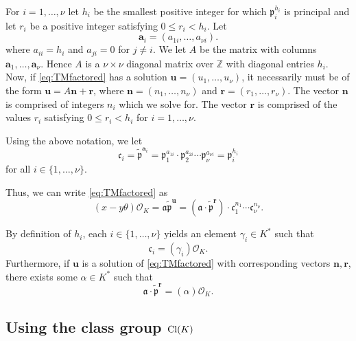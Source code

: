For $i = 1, \dots, {\nu}$ let $h_i$ be the smallest positive integer for which $\mathfrak{p}_i^{h_i}$ is principal and let 
$r_i$ be a positive integer satisfying $0 \leq r_i < h_i$. Let
\[\mathbf{a}_i = (a_{1i}, \dots, a_{{\nu}i}).\]
where $a_{ii} = h_i$ and $a_{ji} = 0$ for $j \neq i$. We let $A$ be the matrix with columns $\mathbf{a}_1, \dots, \mathbf{a}_{\nu}$. Hence $A$ is a $\nu \times \nu$ diagonal matrix over $\mathbb{Z}$ with diagonal entries $h_i$. Now, if \eqref{eq:TMfactored} has a solution $\mathbf{u} = (u_1, \dots, u_{\nu})$, it necessarily must be of the form $\mathbf{u} = A\mathbf{n} + \mathbf{r}$, where $\mathbf{n} = (n_1, \dots, n_{\nu})$ and $\mathbf{r} = (r_1, \dots, r_{\nu})$. The vector $\mathbf{n}$ is comprised of integers $n_i$ which we solve for. The vector $\mathbf{r}$ is comprised of the values $r_i$ satisfying $0 \leq r_i < h_i$ for $i = 1, \dots, \nu$. 

Using the above notation, we let
\[\mathfrak{c}_i = \tilde{\mathfrak{p}}^{\mathbf{a}_i}=\mathfrak{p}_1^{a_{1i}}\cdot \mathfrak{p}_2^{a_{2i}} \cdots \mathfrak{p}_{\nu}^{a_{{\nu}i}} = \mathfrak{p}_i^{h_i} \]
for all $i \in \{1, \dots, {\nu}\}$.

Thus, we can write \eqref{eq:TMfactored} as
\[ (x-y\theta) \mathcal{O}_K = \mathfrak{a} \tilde{\mathfrak{p}}^{\mathbf{u}}  = (\mathfrak{a} \cdot \tilde{\mathfrak{p}}^\mathbf{r}) \cdot \mathfrak{c}_1^{n_1}\cdots \mathfrak{c}_{\nu}^{n_{\nu}}.\]

By definition of $h_i$, each $i \in \{1, \dots, {\nu}\}$ yields an element $\gamma_i \in K^*$ such that 
\[\mathfrak{c}_i = (\gamma_i) \mathcal{O}_K.\]
Furthermore, if $\mathbf{u}$ is a solution of \eqref{eq:TMfactored} with corresponding vectors $\mathbf{n}, \mathbf{r}$, there exists some $\alpha \in K^*$ such that 
\[\mathfrak{a} \cdot \tilde{\mathfrak{p}}^\mathbf{r}= (\alpha)\mathcal{O}_K.\]


\subsection{Using the class group $\operatorname{Cl}(K)$}
\label{subsec:FactorizationTMwithOK}

